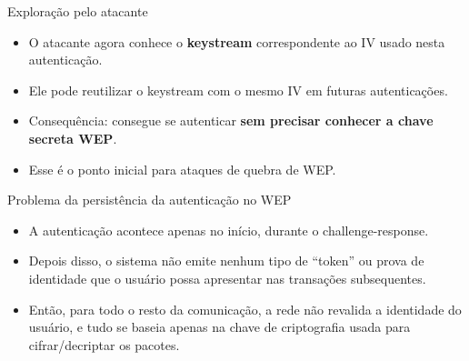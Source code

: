 \begin{frame}{Exploração pelo atacante}
    

\begin{itemize}
    \item O atacante agora conhece o \textbf{keystream} correspondente ao IV usado nesta autenticação.
    \item Ele pode reutilizar o keystream com o mesmo IV em futuras autenticações.
    \item Consequência: consegue se autenticar \textbf{sem precisar conhecer a chave secreta WEP}.
    \item Esse é o ponto inicial para ataques de quebra de WEP.

\end{itemize}
\end{frame}


\begin{frame}{Problema da persistência da autenticação no WEP}
\begin{itemize}




    \item A autenticação acontece apenas no início, durante o challenge-response.



    \item Depois disso, o sistema não emite nenhum tipo de “token” ou prova de identidade que o usuário possa apresentar nas transações subsequentes.

    \item Então, para todo o resto da comunicação, a rede não revalida a identidade do usuário, e tudo se baseia apenas na chave de criptografia usada para cifrar/decriptar os pacotes.
\end{itemize}    
\end{frame}

